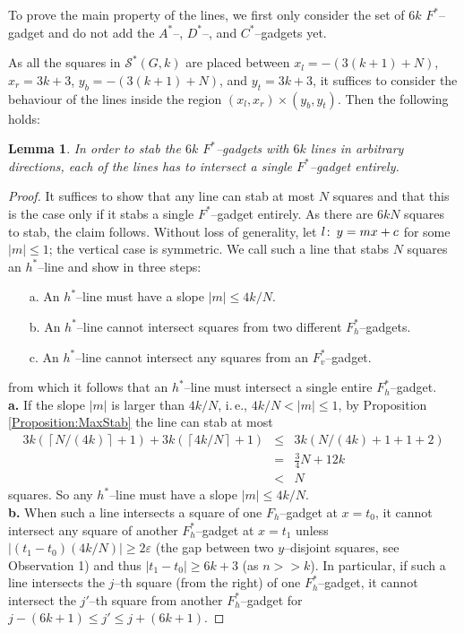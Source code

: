 \documentclass[12pt]{article}
\newtheorem{lemma}[definition]{Lemma}
\newcommand{\eps}{\varepsilon}
\newcommand{\co}{\colon\thinspace}
\newcommand{\calS}{\mathcal{S}}
\newcommand{\rup}[1]{ \left\lceil  #1 \right\rceil}
\begin{document}
To prove the main property of the lines, we first only consider the set of $6k$ $F^*$--gadget and do not add the $A^*$--, $D^*$--, and $C^*$--gadgets yet. 

As all the squares in $\calS^*(G, k)$ are placed between $x_l = -\left(3(k + 1) + N\right)$, $x_r = 3k + 3$, $y_b = -\left(3(k + 1) + N\right)$, and $y_t = 3k + 3$, it suffices to consider the behaviour of the lines inside the region $(x_l, x_r) \times (y_b, y_t)$.
Then the following holds:
\begin{lemma}\label{Lemma:SlopeLemma} In order to stab the $6k$ $F^*$--gadgets with $6k$ lines in arbitrary directions, each of the lines has to intersect a single $F^*$--gadget entirely.
\end{lemma}
\begin{proof} 
It suffices to show that any line can stab at most $N$ squares and that this is the case only if it stabs a single $F^*$--gadget entirely. As there are $6kN$ squares to stab, the claim follows. Without loss of generality, let $l\co y = mx + c$ for some $|m| \leq 1$; the vertical case is symmetric. We call such a line that stabs $N$ squares an $h^*$--line and show in three steps:
\begin{enumerate}
	\item[a.] An $h^*$--line must have a slope $|m| \leq 4k/N$.
	\item[b.] An $h^*$--line cannot intersect squares from two different $F_h^*$--gadgets.
	\item[c.] An $h^*$--line cannot intersect any squares from an $F_v^*$--gadget.
\end{enumerate}
from which it follows that an $h^*$--line must intersect a single entire $F_h^*$--gadget.
\medskip
\noindent
\\
\textbf{a.} If the slope $|m|$ is larger than $4k/N$, i.\,e., $4k/N < |m| \leq 1$, by Proposition \ref{Proposition:MaxStab} the line can stab at most
\begin{eqnarray*}
3k(\rup{N/(4k)} + 1) + 3k(\rup{4k/N} + 1) & \leq & 3k(N/(4k) + 1 + 1 +2) \\
                                          & = & \frac{3}{4}N + 12k\\
                                          & < & N 
\end{eqnarray*}
squares. So any $h^*$--line must have a slope $|m| \leq 4k/N$.
\medskip
\noindent
\\
\textbf{b.} When such a line intersects a square of one $F_h$--gadget at $x = t_0$, it cannot intersect any square of another $F_h^*$--gadget at $x = t_1$ unless $|(t_1 - t_0)(4k/N)| \geq 2\eps$ (the gap between two $y$--disjoint squares, see Observation 1) and thus $|t_1 - t_0| \geq 6k + 3$ (as $n >> k$). In particular, if such a line intersects the $j$--th square (from the right) of one $F_h^*$--gadget, it cannot intersect the $j'$--th square from another $F_h^*$--gadget for $j - (6k + 1) \leq j' \leq j + (6k+1)$.


\end{proof}
\end{document}
